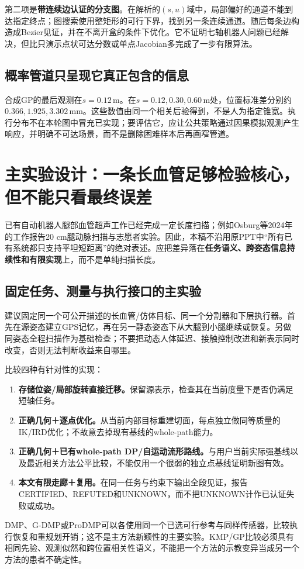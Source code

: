 \documentclass[UTF8,11pt,a4paper,fontset=fandol]{ctexart}
\numberwithin{equation}{section}
\theoremstyle{definition}
\begin{document}
第二项是\textbf{带连续边认证的分支图}。在解析的$(s,u)$域中，局部偏好的通道不能到达指定终点；图搜索使用整矩形的可行下界，找到另一条连续通道。随后每条边构造成Bezier见证，并在不离开盒的条件下优化。它不证明七轴机器人问题已经解决，但比只演示点状可达分数或单点Jacobian多完成了一步有限算法。

\subsection{概率管道只呈现它真正包含的信息}
合成GP的最后观测在$s=0.12\,\mathrm m$。在$s=0.12,0.30,0.60\,\mathrm m$处，位置标准差分别约$0.366,1.925,3.302\,\mathrm{mm}$。这些数值由同一个相关后验得到，不是人为指定锥宽。执行分布不在本轮图中冒充已实现；要评估它，应让公共策略通过因果模拟观测产生响应，并明确不可达场景，而不是删除困难样本后再画窄管道。

\section{主实验设计：一条长血管足够检验核心，但不能只看最终误差}
已有自动机器人腿部血管超声工作已经完成一定长度扫描；例如Osburg等2024年的工作报告20 cm腿动脉扫描与志愿者实验\cite{osburg2024}。因此，本稿不沿用原PPT中“所有已有系统都只支持平坦短距离”的绝对表述。应把差异落在\textbf{任务语义、跨姿态信息持续性和有限实现}上，而不是单纯扫描长度。

\subsection{固定任务、测量与执行接口的主实验}
建议固定同一个可公开描述的长血管/仿体目标、同一个分割器和下层执行器。首先在源姿态建立GPS记忆，再在另一静态姿态下从大腿到小腿继续或恢复。另做同姿态全程扫描作为基础检查；不要把动态人体延迟、接触控制改进和新表示同时改变，否则无法判断收益来自哪里。

比较四种有针对性的实现：
\begin{enumerate}
\item \textbf{存储位姿/局部旋转直接迁移。}保留源表示，检查其在当前度量下是否仍满足短轴任务。
\item \textbf{正确几何＋逐点优化。}从当前内部目标重建切面，每点独立做同等质量的IK/IRD优化；不故意去掉现有基线的whole-path能力。
\item \textbf{正确几何＋已有whole-path DP/自运动流形路线。}与用户当前实际强基线以及最近相关方法公平比较，不能仅用一个很弱的独立点基线证明新图有效。
\item \textbf{本文有限走廊＋复用。}在同一任务与约束下输出全段见证，报告CERTIFIED、REFUTED和UNKNOWN，而不把UNKNOWN计作已认证失败或成功。
\end{enumerate}
DMP、G-DMP或ProDMP可以各使用同一个已选可行参考与同样传感器，比较执行恢复和重规划开销；这不是主方法新颖性的主要实验。KMP/GP比较必须具有相同先验、观测似然和跨位置相关性语义，不能把一个方法的示教变异当成另一个方法的患者不确定性。
\end{document}
